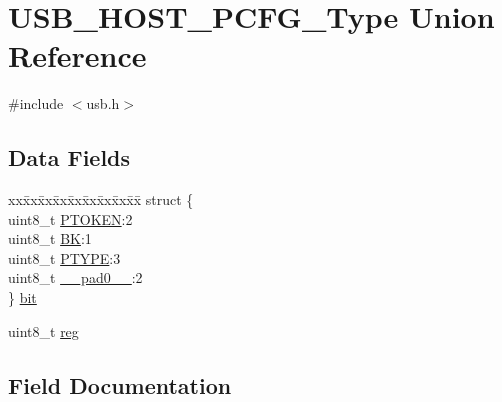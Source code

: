 \hypertarget{union_u_s_b___h_o_s_t___p_c_f_g___type}{}\section{U\+S\+B\+\_\+\+H\+O\+S\+T\+\_\+\+P\+C\+F\+G\+\_\+\+Type Union Reference}
\label{union_u_s_b___h_o_s_t___p_c_f_g___type}


{\ttfamily \#include $<$usb.\+h$>$}

\subsection*{Data Fields}
\begin{DoxyCompactItemize}
\item 
\begin{tabbing}
xx\=xx\=xx\=xx\=xx\=xx\=xx\=xx\=xx\=\kill
struct \{\\
\>uint8\_t \mbox{\hyperlink{union_u_s_b___h_o_s_t___p_c_f_g___type_a40119b1c3fee4e4b3d83ab216a7d6821}{PTOKEN}}:2\\
\>uint8\_t \mbox{\hyperlink{union_u_s_b___h_o_s_t___p_c_f_g___type_a216549de69ffbb8a4bb7a1b8f363007b}{BK}}:1\\
\>uint8\_t \mbox{\hyperlink{union_u_s_b___h_o_s_t___p_c_f_g___type_a56c0197185943024e0f89f0a647d1024}{PTYPE}}:3\\
\>uint8\_t \mbox{\hyperlink{union_u_s_b___h_o_s_t___p_c_f_g___type_a8b4eebe79ded0459acec2f4950102ba3}{\_\_pad0\_\_}}:2\\
\} \mbox{\hyperlink{union_u_s_b___h_o_s_t___p_c_f_g___type_ac22920e690be86f30a284aa49eebf4f8}{bit}}\\

\end{tabbing}\item 
uint8\+\_\+t \mbox{\hyperlink{union_u_s_b___h_o_s_t___p_c_f_g___type_a9428adc9af4653a2050e2536b55dec8d}{reg}}
\end{DoxyCompactItemize}


\subsection{Field Documentation}
\mbox{\label{union_u_s_b___h_o_s_t___p_c_f_g___type_a8b4eebe79ded0459acec2f4950102ba3}} 
